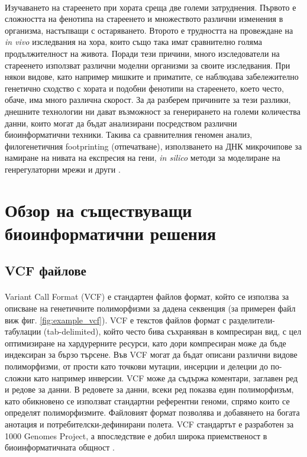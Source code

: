 \documentclass[pdftex,cyrillic,14pt,a4page,twoside,openright]{extreport}
\begin{document}
\paragraph{}
Изучаването на стареенето при хората среща две големи затруднения. Първото е сложността на фенотипа на стареенето и множеството различни изменения в организма, настъпващи с остаряването. Второто е трудността на провеждане на \textit{in vivo} изследвания на хора, които също така имат сравнително голяма продължителност на живота. Поради тези причини, много изследователи на стареенето използват различни моделни организми за своите изследвания. При някои видове, като например мишките и приматите, се наблюдава забележително генетично сходство с хората и подобни фенотипи на стареенето, което често, обаче, има много различна скорост. За да разберем причините за тези разлики, днешните технологии ни дават възможност за генерирането на големи количества данни, които могат да бъдат анализирани посредством различни биоинформатични техники. Такива са сравнителния геномен анализ, филогенетичния footprinting (отпечатване), използването на ДНК микрочипове за намиране на нивата на експресия на гени, \textit{in silico} методи за моделиране на генрегулаторни мрежи и други \cite{demagalhaes2004}.
 
\section[Обзор на съществуващи биоинформатични решения]{Обзор на съществуващи\\ биоинформатични решения}
\subsection{VCF файлове}
\paragraph{}
Variant Call Format (VCF) е стандартен файлов формат, който се използва за описване на генетичните полиморфизми за дадена секвенция (за примерен файл виж фиг. \ref{fig:example_vcf}). VCF е текстов файлов формат с разделители-табулации (tab-delimited), който често бива съхраняван в компресиран вид, с цел оптимизиране на хардурерните ресурси, като дори компресиран може да бъде индексиран за бързо търсене. Във VCF могат да бъдат описани различни видове полиморфизми, от прости като точкови мутации, инсерции и делеции до по-сложни като например инверсии. VCF може да съдържа коментари, заглавен ред и редове за данни. В редовете за данни, всеки ред показва един полиморфизъм, като обикновено се използват стандартни референтни геноми, спрямо които се определят полиморфизмите. Файловият формат позволява и добавянето на богата анотация и потребителски-дефинирани полета. VCF стандартът е разработен за 1000 Genomes Project, а впоследствие е добил широка приемственост в биоинформатичната общност \cite{danecek2011}.
\end{document}
